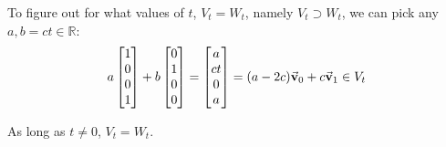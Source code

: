 \documentclass{article}
\begin{document}
\begin{exercise}{12}
\begin{enumerate}
To figure out for what values of $t$, $V_t = W_t$, namely $V_t \supset W_t$, we can pick any $a, b=ct \in \mathbb{R}$:
$$a\begin{bmatrix}1\\0\\0\\1\end{bmatrix} + b\begin{bmatrix}0\\1\\0\\0\end{bmatrix} = \begin{bmatrix}a\\ct\\0\\a\end{bmatrix} = (a-2c)\vec{\mathbf{v}}_0 + c\vec{\mathbf{v}}_1 \in V_t$$

As long as $t \neq 0$, $V_t = W_t$.
\end{enumerate}
\end{exercise}
\end{document}
